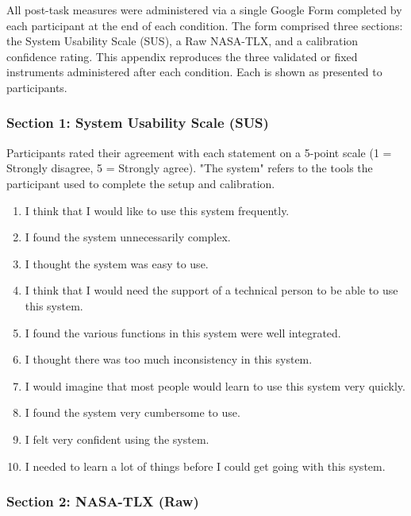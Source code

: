 \documentclass[
]{article}
\begin{document}
All post-task measures were administered via a single Google Form completed by each participant at the end of each condition. The form comprised three sections: the System Usability Scale (SUS), a Raw NASA-TLX, and a calibration confidence rating. This appendix reproduces the three validated or fixed instruments administered after each condition. Each is shown as presented to participants.

\hypertarget{section-1-system-usability-scale-sus}{%
\subsubsection{Section 1: System Usability Scale (SUS)}\label{section-1-system-usability-scale-sus}}

Participants rated their agreement with each statement on a 5-point scale (1 = Strongly disagree, 5 = Strongly agree). "The system" refers to the tools the participant used to complete the setup and calibration.

\begin{enumerate}
\def\labelenumi{\arabic{enumi}.}
\item
  I think that I would like to use this system frequently.
\item
  I found the system unnecessarily complex.
\item
  I thought the system was easy to use.
\item
  I think that I would need the support of a technical person to be able to use this system.
\item
  I found the various functions in this system were well integrated.
\item
  I thought there was too much inconsistency in this system.
\item
  I would imagine that most people would learn to use this system very quickly.
\item
  I found the system very cumbersome to use.
\item
  I felt very confident using the system.
\item
  I needed to learn a lot of things before I could get going with this system.
\end{enumerate}

\hypertarget{section-2-nasa-tlx-raw}{%
\subsubsection{Section 2: NASA-TLX (Raw)}\label{section-2-nasa-tlx-raw}}
\end{document}
